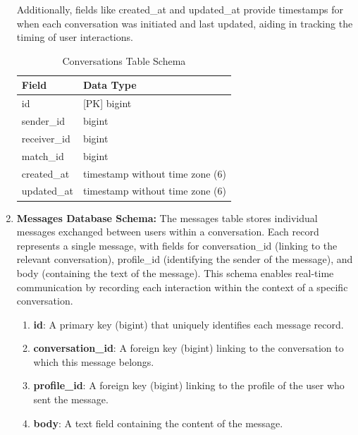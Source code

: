 \begin{enumerate}
    \bigskip Additionally, fields like created\_at and updated\_at provide timestamps for when each conversation was initiated and last updated, aiding in tracking the timing of user interactions.
    
    \begin{table}[h!]
    \captionsetup{justification=centering, singlelinecheck=false, labelsep=space}
    \centering
    \begin{tabular}{ll}
    \hline
    \textbf{Field}               & \textbf{Data Type}                 \\ \hline
    id                           & [PK] bigint                        \\ 
    sender\_id                   & bigint                             \\ 
    receiver\_id                 & bigint                             \\ 
    match\_id                    & bigint                             \\ 
    created\_at                  & timestamp without time zone (6)    \\ 
    updated\_at                  & timestamp without time zone (6)    \\ \hline
    \end{tabular}
    \caption{Conversations Table Schema}
    \label{tab:Conversations Table Schema}
    \end{table}

    \newpage
    \item \textbf{Messages Database Schema:}
    The messages table stores individual messages exchanged between users within a conversation. Each record represents a single message, with fields for conversation\_id (linking to the relevant conversation), profile\_id (identifying the sender of the message), and body (containing the text of the message). This schema enables real-time communication by recording each interaction within the context of a specific conversation.

    \begin{enumerate}
    \item \textbf{id}: A primary key (bigint) that uniquely identifies each message record.
    \item \textbf{conversation\_id}: A foreign key (bigint) linking to the conversation to which this message belongs.
    \item \textbf{profile\_id}: A foreign key (bigint) linking to the profile of the user who sent the message.
    \item \textbf{body}: A text field containing the content of the message.
    \end{enumerate}
    

\end{enumerate}
